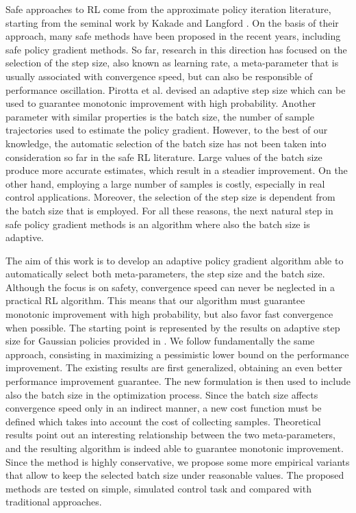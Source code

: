Safe approaches to \ac{RL} come from the approximate policy iteration literature, starting from the seminal work by Kakade and Langford \cite{kakade2002approximately}. On the basis of their approach, many safe methods have been proposed in the recent years, including safe policy gradient methods. So far, research in this direction has focused on the selection of the step size, also known as learning rate, a meta-parameter that is usually associated with convergence speed, but can also be responsible of performance oscillation. Pirotta et al. \cite{pirotta2015policy} devised an adaptive step size which can be used to guarantee monotonic improvement with high probability. 
Another parameter with similar properties is the batch size, the number of sample trajectories used to estimate the policy gradient. However, to the best of our knowledge, the automatic selection of the batch size has not been taken into consideration so far in the safe \ac{RL} literature.
Large values of the batch size produce more accurate estimates, which result in a steadier improvement. On the other hand, employing a large number of samples is costly, especially in real control applications. Moreover, the selection of the step size is dependent from the batch size that is employed. For all these reasons, the next natural step in safe policy gradient methods is an algorithm where also the batch size is adaptive.  

The aim of this work is to develop an adaptive policy gradient algorithm able to automatically select both meta-parameters, the step size and the batch size. Although the focus is on safety, convergence speed can never be neglected in a practical \ac{RL} algorithm. This means that our algorithm must guarantee monotonic improvement with high probability, but also favor fast convergence when possible. The starting point is represented by the results on adaptive step size for Gaussian policies provided in \cite{pirotta2015policy}. We follow fundamentally the same approach, consisting in maximizing a pessimistic lower bound on the performance improvement. The existing results are first generalized, obtaining an even better performance improvement guarantee. The new formulation is then used to include also the batch size in the optimization process. Since the batch size affects convergence speed only in an indirect manner, a new cost function must be defined which takes into account the cost of collecting samples. Theoretical results point out an interesting relationship between the two meta-parameters, and the resulting algorithm is indeed able to guarantee monotonic improvement. Since the method is highly conservative, we propose some more empirical variants that allow to keep the selected batch size under reasonable values. The proposed methods are tested on simple, simulated control task and compared with traditional approaches.

